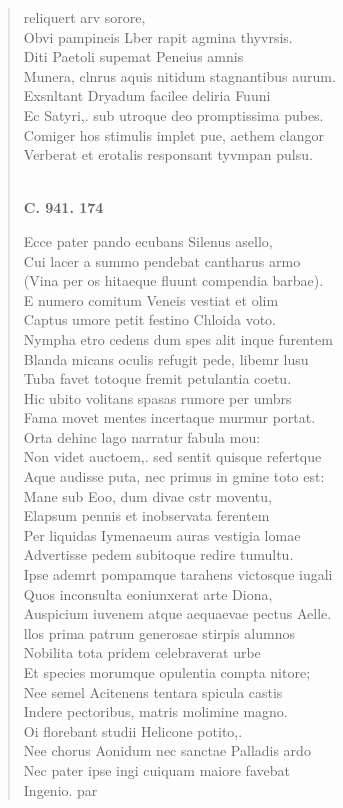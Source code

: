 \documentclass[11pt, a4paper]{report}
\begin{document}
\begin{verse}
reliquert arv sorore, \\ Obvi pampineis Lber rapit agmina thyvrsis. \\ Diti Paetoli supemat Peneius amnis \\ Munera, clnrus aquis nitidum stagnantibus aurum. \\ Exsnltant Dryadum facilee deliria Fuuni \\ Ec Satyri,. sub utroque deo promptissima pubes. \\ Comiger hos stimulis implet pue, aethem clangor \\ Verberat et erotalis responsant tyvmpan pulsu. \\ 
        ﻿\pagebreak 
    \begin{center} \textbf{C. 941. 174} \end{center} \marginpar{[363]} Ecce pater pando ecubans Silenus asello, \\ Cui lacer a summo pendebat cantharus armo \\ (Vina per os hitaeque fluunt compendia barbae). \\ E numero comitum Veneis vestiat et olim \\ Captus umore petit festino Chloida voto. \\ Nympha etro cedens dum spes alit inque furentem \\ Blanda micans oculis refugit pede, libemr lusu \\ Tuba favet totoque fremit petulantia coetu. \\ Hic ubito volitans spasas rumore per umbrs \\ Fama movet mentes incertaque murmur portat. \\ Orta dehinc lago narratur fabula mou: \\ Non videt auctoem,. sed sentit quisque refertque \\ Aque audisse puta, nec primus in gmine toto est: \\ Mane sub Eoo, dum divae cstr moventu, \\ Elapsum pennis et inobservata ferentem \\ Per liquidas Iymenaeum auras vestigia lomae \\ Advertisse pedem subitoque redire tumultu. \\ Ipse ademrt pompamque tarahens victosque iugali \\ Quos inconsulta eoniunxerat arte Diona, \\ Auspicium iuvenem atque aequaevae pectus Aelle. \\ llos prima patrum generosae stirpis alumnos \\ Nobilita tota pridem celebraverat urbe \\ Et species morumque opulentia compta nitore; \\ Nee semel Acitenens tentara spicula castis \\ Indere pectoribus, matris molimine magno. \\ Oi florebant studii Helicone potito,. \\ Nee chorus Aonidum nec sanctae Palladis ardo \\ Nec pater ipse ingi cuiquam maiore favebat \\ Ingenio. par 
\end{verse}
\end{document}

